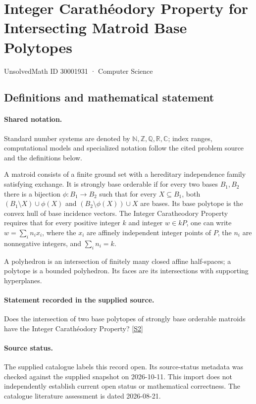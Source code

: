 \documentclass[11pt]{article}
\newcommand{\sref}[2]{\hyperlink{source:#1:#2}{[S#2]}}
\begin{document}
\setcounter{section}{30001930}
\section{Integer Carathéodory Property for Intersecting Matroid Base Polytopes}\label{30001931}
{\small\sffamily UnsolvedMath ID 30001931 · Computer Science}
\subsection{Definitions and mathematical statement}

\paragraph{Shared notation.}Standard number systems are denoted by $\mathbb N,\mathbb Z,\mathbb Q,\mathbb R,\mathbb C$; index ranges, computational models and specialized notation follow the cited problem source and the definitions below.


A matroid consists of a finite ground set with a hereditary independence family satisfying exchange. It is strongly base orderable if for every two bases $B_1,B_2$ there is a bijection $\phi:B_1\to B_2$ such that for every $X\subseteq B_1$, both $(B_1\setminus X)\cup\phi(X)$ and $(B_2\setminus\phi(X))\cup X$ are bases. Its base polytope is the convex hull of base incidence vectors. The Integer Caratheodory Property requires that for every positive integer $k$ and integer $w\in kP$, one can write $w=\sum_i n_ix_i$, where the $x_i$ are affinely independent integer points of $P$, the $n_i$ are nonnegative integers, and $\sum_i n_i=k$.

A polyhedron is an intersection of finitely many closed affine half-spaces; a polytope is a bounded polyhedron. Its faces are its intersections with supporting hyperplanes.
\paragraph{Statement recorded in the supplied source.}
Does the intersection of two base polytopes of strongly base orderable matroids have the Integer Carathéodory Property? \sref{30001931}{2}
\paragraph{Source status.}
The supplied catalogue labels this record open. Its source-status metadata was checked against the supplied snapshot on 2026-10-11. This import does not independently establish current open status or mathematical correctness. The catalogue literature assessment is dated 2026-08-21.
\end{document}
